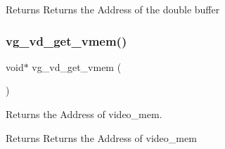 \begin{DoxyReturn}{Returns}
Returns the Address of the double buffer 
\end{DoxyReturn}
\hypertarget{group__video__gr_ga5ad1cc85a8dce3ce1a7d3e90e6ff88d3}{}\label{group__video__gr_ga5ad1cc85a8dce3ce1a7d3e90e6ff88d3} 
\subsubsection{\texorpdfstring{vg\+\_\+vd\+\_\+get\+\_\+vmem()}{vg\_vd\_get\_vmem()}}
{\footnotesize\ttfamily void$\ast$ vg\+\_\+vd\+\_\+get\+\_\+vmem (\begin{DoxyParamCaption}{ }\end{DoxyParamCaption})}



Returns the Address of video\+\_\+mem. 

\begin{DoxyReturn}{Returns}
Returns the Address of video\+\_\+mem 
\end{DoxyReturn}

